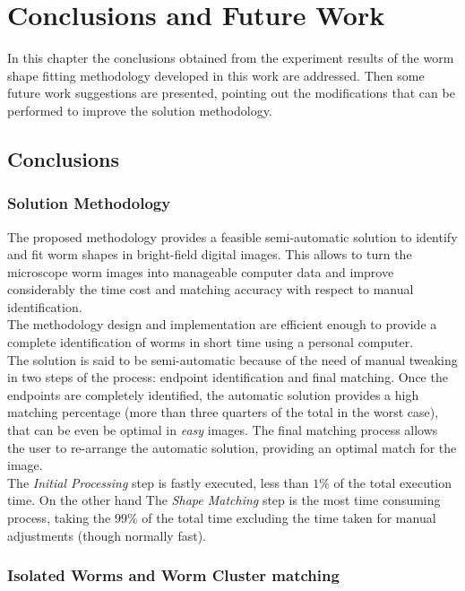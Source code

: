 \cleardoublepage
\chapter{Conclusions and Future Work}

In this chapter the conclusions obtained from the experiment results of the 
worm shape fitting methodology developed in this work are addressed.
Then some future work suggestions are presented, pointing out the modifications
that can be performed to improve the solution methodology.

\section{Conclusions}

\subsection*{Solution Methodology}

The proposed methodology provides a feasible semi-automatic solution
to identify and fit worm shapes in bright-field digital images. This allows
to turn the microscope worm images into manageable computer data and 
improve considerably the time cost and matching accuracy with respect
to manual identification.\\
The methodology design and implementation are efficient enough to provide
a complete identification of worms in short time using a personal computer.\\
The solution is said to be semi-automatic because of the need of manual
tweaking in two steps of the process: endpoint identification and
final matching. Once the endpoints are completely identified, the automatic
solution provides a high matching percentage (more than three quarters of 
the total in the worst case), that can be even be optimal in \emph{easy} 
images. The final matching process allows the user to re-arrange the 
automatic solution, providing an optimal match for the image.\\
The \emph{Initial Processing} step is fastly executed, less than
$1\%$ of the total execution time. On the other hand The \emph{Shape Matching}
step is the most time consuming process, taking the $99\%$ of the total
time excluding the time taken for manual adjustments (though normally fast).

\subsection*{Isolated Worms and Worm Cluster matching}

